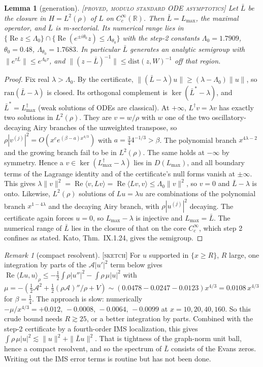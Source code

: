 \documentclass[11pt]{amsart}
\newtheorem{lemma}[theorem]{Lemma}
\theoremstyle{remark}
\newtheorem{remark}[theorem]{Remark}
\newcommand{\R}{\mathbb{R}}
\newcommand{\ip}[2]{\langle #1,#2\rangle}
\newcommand{\re}{\operatorname{Re}}
\newcommand{\lab}[1]{\textup{\textsc{[#1]}}}
\begin{document}
\begin{lemma}[generation]\label{lem:gen}\lab{proved, modulo standard ODE asymptotics}
Let $\bar L$ be the closure in $H=L^2(\rho)$ of $L$ on $C_c^\infty(\R)$. Then $\bar L=L_{\max}$, the maximal operator, and $\bar L$ is m-sectorial. Its numerical range lies in $\{\re z\le\Lambda_0\}\cap\{\re(e^{\pm i\theta_0}z)\le\Lambda_{\theta_0}\}$ with the step-2 constants $\Lambda_0=1.7909$, $\theta_0=0.48$, $\Lambda_{\theta_0}=1.7683$. In particular $\bar L$ generates an analytic semigroup with $\|e^{\tau\bar L}\|\le e^{\Lambda_0\tau}$, and $\|(z-\bar L)^{-1}\|\le\mathrm{dist}(z,W)^{-1}$ off that region.
\end{lemma}
\begin{proof}
Fix real $\lambda>\Lambda_0$. By the certificate, $\|(\bar L-\lambda)u\|\ge(\lambda-\Lambda_0)\|u\|$, so $\mathrm{ran}(\bar L-\lambda)$ is closed. Its orthogonal complement is $\ker(\bar L^*-\lambda)$, and $\bar L^*=L^\dagger_{\max}$ (weak solutions of ODEs are classical). At $+\infty$, $L^\dagger v=\lambda v$ has exactly two solutions in $L^2(\rho)$. They are $v=w/\rho$ with $w$ one of the two oscillatory-decaying Airy branches of the unweighted transpose, so $\rho|v^{(j)}|^2=O(x^ce^{(\beta-a)x^{4/3}})$ with $a=\frac34 4^{-1/3}>\beta$. The polynomial branch $x^{4\lambda-2}$ and the growing branch fail to be in $L^2(\rho)$. The same holds at $-\infty$ by symmetry. Hence a $v\in\ker(L^\dagger_{\max}-\lambda)$ lies in $D(L_{\max})$, and all boundary terms of the Lagrange identity and of the certificate's null forms vanish at $\pm\infty$. This gives $\lambda\|v\|^2=\re\ip{v}{Lv}=\re\ip{Lv}{v}\le\Lambda_0\|v\|^2$, so $v=0$ and $\bar L-\lambda$ is onto. Likewise, $L^2(\rho)$ solutions of $Lu=\lambda u$ are combinations of the polynomial branch $x^{1-4\lambda}$ and the decaying Airy branch, with $\rho|u^{(j)}|^2$ decaying. The certificate again forces $u=0$, so $L_{\max}-\lambda$ is injective and $L_{\max}=\bar L$. The numerical range of $\bar L$ lies in the closure of that on the core $C_c^\infty$, which step 2 confines as stated. Kato, Thm.~IX.1.24, gives the semigroup.
\end{proof}
\begin{remark}[compact resolvent]\lab{sketch}
For $u$ supported in $\{x\ge R\}$, $R$ large, one integration by parts of the $\mathcal A|u'|^2$ term below gives
$\re\ip{Lu}{u}_\rho\le-\frac12\int\rho|u''|^2-\int\rho\,\mu|u|^2$ with $\mu=-(\frac12\mathcal A^2+\frac12(\rho\mathcal A)''/\rho+V)\sim(0.0478-0.0247-0.0123)x^{4/3}=0.0108\,x^{4/3}$ for $\beta=\frac14$. The approach is slow: numerically $-\mu/x^{4/3}=+0.012,\,-0.0008,\,-0.0064,\,-0.0099$ at $x=10,20,40,160$. So this crude bound needs $R\gtrsim25$, or a better integration by parts. Combined with the step-2 certificate by a fourth-order IMS localization, this gives $\int\rho\,\mu|u|^2\lesssim\|u\|^2+\|\bar Lu\|^2$. That is tightness of the graph-norm unit ball, hence a compact resolvent, and so the spectrum of $\bar L$ consists of the Evans zeros. Writing out the IMS error terms is routine but has not been done.
\end{remark}
\end{document}
